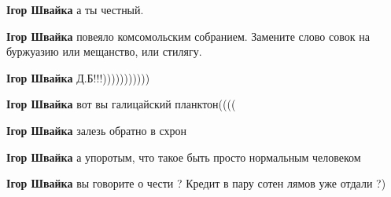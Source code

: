 \begin{itemize}
\begin{itemize}
\textbf{Ігор Швайка} а ты честный.

 
\textbf{Ігор Швайка} повеяло комсомольским собранием. Замените слово совок на буржуазию или мещанство, или стилягу.

 
\textbf{Ігор Швайка} Д.Б!!!)))))))))))

 
\textbf{Ігор Швайка} вот вы галицайский планктон((((

 
\textbf{Ігор Швайка} залезь обратно в схрон

 
\textbf{Ігор Швайка} а упоротым, что такое быть просто нормальным человеком

 
\textbf{Ігор Швайка} вы говорите о чести ? Кредит в пару сотен лямов уже отдали ?)

 

\end{itemize}
\end{itemize}
